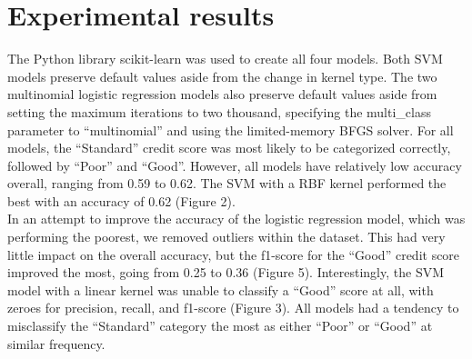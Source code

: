 \documentclass[11pt, twocolumn]{article}
\begin{document}
\section*{Experimental results}
The Python library scikit-learn was used to create all four models. Both SVM models preserve default values aside from the change
in kernel type. The two multinomial logistic regression models also preserve default values aside from setting the maximum iterations
to two thousand, specifying the multi\_class parameter to ``multinomial'' and using the limited-memory BFGS solver.
For all models, the ``Standard'' credit score was most likely to be categorized correctly, followed by ``Poor'' and ``Good''. 
However, all models have relatively low accuracy overall, ranging from 0.59 to 0.62. The SVM with a RBF kernel performed the best with an
accuracy of 0.62 (Figure 2). \\
In an attempt to improve the accuracy of the logistic regression model, which was performing the poorest, we removed outliers within the dataset.
This had very little impact on the overall accuracy, but the f1-score for the ``Good'' credit score improved the most, going from 0.25 to 0.36 (Figure 5).
Interestingly, the SVM model with a linear kernel was unable to classify a ``Good'' score at all, with zeroes for precision, 
recall, and f1-score (Figure 3). All models had a tendency to misclassify the ``Standard'' category the most as either ``Poor'' or 
``Good'' at similar frequency.
\end{document}
